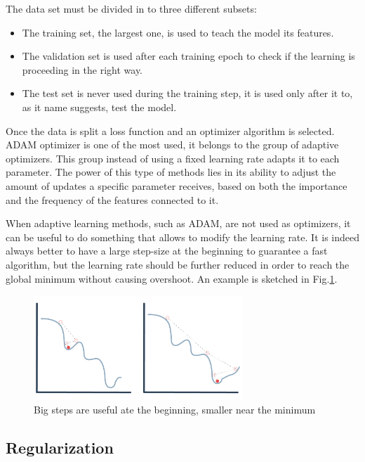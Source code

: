 \documentclass[../../main.tex]{subfiles}
\begin{document}
The data set must be divided in to three different subsets:
\begin{itemize}
    \item The training set, the largest one, is used to teach the model its features.
    \item The validation set is used after each training epoch to check if the learning is proceeding in the right way.
    \item The test set is never used during the training step, it is used only after it to, as it name suggests, test the model. 
\end{itemize}

Once the data is split a loss function and an optimizer algorithm is selected. ADAM optimizer \cite{adam} is one of the most used, it belongs to the group of adaptive optimizers. This group instead of using a fixed learning rate adapts it to each parameter.
The power of this type of methods lies in its ability to adjust the amount of updates a specific parameter receives, based on both the importance and the frequency of the features connected to it.   

When adaptive learning methods, such as ADAM, are not used as optimizers, it can be useful to do something that allows to modify the learning rate. It is indeed always better to have a large step-size at the beginning to guarantee a fast algorithm, but the learning rate should be further reduced in order to reach the global minimum without causing overshoot. An example is sketched in Fig.\ref{fig:learning rate}. 

\begin{figure}[h]
    \centering
\includegraphics[width=0.7\textwidth]{sections/03/Images/Learning_rate.png}
\caption{Big steps are useful ate the beginning, smaller near the minimum}
    \label{fig:learning rate}
\end{figure}


\subsection{Regularization}\label{regularization}
\end{document}
